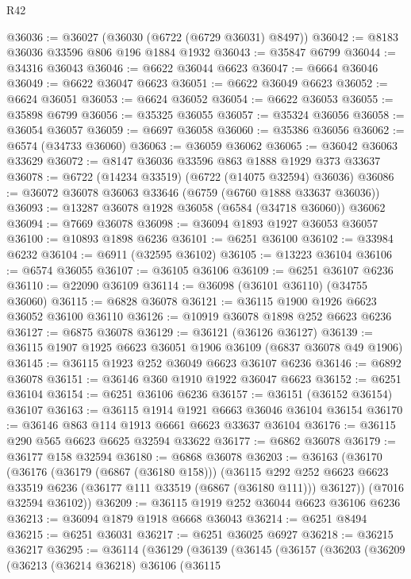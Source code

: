 \begin{lexlean}{R42}
\begin{coremodule}
{@36036 := @36027 (@36030 (@6722 (@6729 @36031) @8497))
@36042 := @8183 @36036 @33596 @806 @196 @1884 @1932
@36043 := @35847 @6799
@36044 := @34316 @36043
@36046 := @6622 @36044 @6623
@36047 := @6664 @36046
@36049 := @6622 @36047 @6623
@36051 := @6622 @36049 @6623
@36052 := @6624 @36051
@36053 := @6624 @36052
@36054 := @6622 @36053
@36055 := @35898 @6799
@36056 := @35325 @36055
@36057 := @35324 @36056
@36058 := @36054 @36057
@36059 := @6697 @36058
@36060 := @35386 @36056
@36062 := @6574 (@34733 @36060)
@36063 := @36059 @36062
@36065 := @36042 @36063 @33629
@36072 := @8147 @36036 @33596 @863 @1888 @1929 @373 @33637
@36078 := @6722 (@14234 @33519) (@6722 (@14075 @32594) @36036)
@36086 := @36072 @36078 @36063 @33646 (@6759 (@6760 @1888 @33637 @36036))
@36093 := @13287 @36078 @1928 @36058 (@6584 (@34718 @36060)) @36062
@36094 := @7669 @36078
@36098 := @36094 @1893 @1927 @36053 @36057
@36100 := @10893 @1898 @6236
@36101 := @6251 @36100
@36102 := @33984 @6232
@36104 := @6911 (@32595 @36102)
@36105 := @13223 @36104
@36106 := @6574 @36055
@36107 := @36105 @36106
@36109 := @6251 @36107 @6236
@36110 := @22090 @36109
@36114 := @36098 (@36101 @36110) (@34755 @36060)
@36115 := @6828 @36078
@36121 := @36115 @1900 @1926 @6623 @36052 @36100 @36110
@36126 := @10919 @36078 @1898 @252 @6623 @6236
@36127 := @6875 @36078
@36129 := @36121 (@36126 @36127)
@36139 := @36115 @1907 @1925 @6623 @36051 @1906 @36109 (@6837 @36078 @49 @1906)
@36145 := @36115 @1923 @252 @36049 @6623 @36107 @6236
@36146 := @6892 @36078
@36151 := @36146 @360 @1910 @1922 @36047 @6623
@36152 := @6251 @36104
@36154 := @6251 @36106 @6236
@36157 := @36151 (@36152 @36154) @36107
@36163 := @36115 @1914 @1921 @6663 @36046 @36104 @36154
@36170 := @36146 @863 @114 @1913 @6661 @6623 @33637 @36104
@36176 := @36115 @290 @565 @6623 @6625 @32594 @33622
@36177 := @6862 @36078
@36179 := @36177 @158 @32594
@36180 := @6868 @36078
@36203 := @36163
    (@36170
      (@36176
        (@36179 (@6867 (@36180 @158)))
        (@36115
          @292
          @252
          @6623
          @6623
          @33519
          @6236
          (@36177 @111 @33519 (@6867 (@36180 @111)))
          @36127))
      (@7016 @32594 @36102))
@36209 := @36115 @1919 @252 @36044 @6623 @36106 @6236
@36213 := @36094 @1879 @1918 @6668 @36043
@36214 := @6251 @8494
@36215 := @6251 @36031
@36217 := @6251 @36025 @6927
@36218 := @36215 @36217
@36295 := @36114
    (@36129
      (@36139
        (@36145
          (@36157
            (@36203
              (@36209
                (@36213
                  (@36214 @36218)
                  @36106
                  (@36115
}
\end{coremodule}
\end{lexlean}
